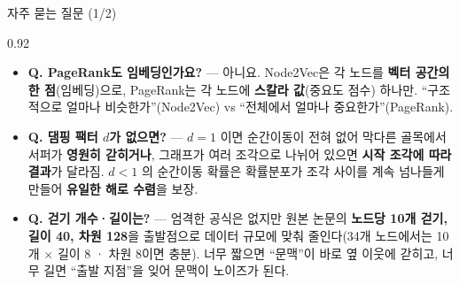 \begin{frame}{자주 묻는 질문 (1/2)}
\begin{center}\begin{varwidth}{0.92\textwidth}
  \small
  \begin{itemize}
    \item \textbf{Q. PageRank도 임베딩인가요?} --- 아니요.
      Node2Vec은 각 노드를 \textbf{벡터 공간의 한 점}(임베딩)으로,
      PageRank는 각 노드에 \textbf{스칼라 값}(중요도 점수) 하나만.
      ``구조적으로 얼마나 비슷한가''(Node2Vec) vs ``전체에서 얼마나
      중요한가''(PageRank).
    \item \textbf{Q. 댐핑 팩터 $d$가 없으면?} --- $d{=}1$ 이면
      순간이동이 전혀 없어 막다른 골목에서 서퍼가 \textbf{영원히
      갇히거나}, 그래프가 여러 조각으로 나뉘어 있으면 \textbf{시작
      조각에 따라 결과}가 달라짐. $d{<}1$ 의 순간이동 확률은
      확률분포가 조각 사이를 계속 넘나들게 만들어 \textbf{유일한
      해로 수렴}을 보장.
    \item \textbf{Q. 걷기 개수·길이는?} --- 엄격한 공식은 없지만
      원본 논문의 \textbf{노드당 10개 걷기, 길이 40, 차원 128}을
      출발점으로 데이터 규모에 맞춰 줄인다(34개 노드에서는
      10개 $\times$ 길이 8 · 차원 8이면 충분). 너무 짧으면
      ``문맥''이 바로 옆 이웃에 갇히고, 너무 길면 ``출발 지점''을
      잊어 문맥이 노이즈가 된다.
  \end{itemize}
\end{varwidth}\end{center}
\end{frame}
